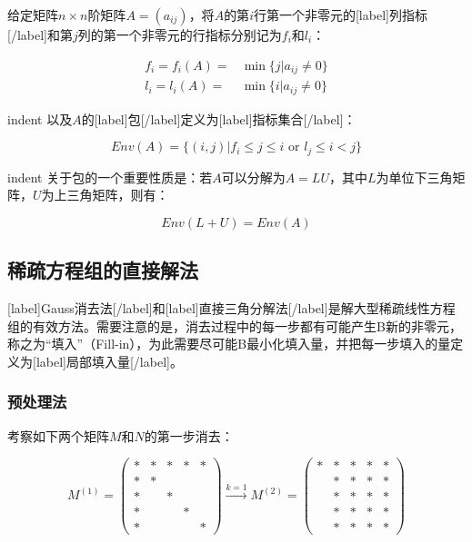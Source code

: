 \documentclass[UTF8,nofonts]{ctexart}
\begin{document}
给定矩阵$n \times n$阶矩阵$A=(a_{ij})$，将$A$的第$i$行第一个非零元的[label]列指标[/label]和第$j$列的第一个非零元的行指标分别记为$f_i$和$l_i$：

\begin{align*}
f_i=f_i(A)=&\min\{j|a_{ij} \neq 0\} \\
l_i=l_i(A)=&\min\{i|a_{ij} \neq 0\}
\end{align*}

indent 以及$A$的[label]包[/label]定义为[label]指标集合[/label]：

\[
Env(A)=\Big\{(i,j)|f_i \leq j \leq i\text{ or }l_j \leq i < j\Big\}
\]

indent 关于包的一个重要性质是：若$A$可以分解为$A=LU$，其中$L$为单位下三角矩阵，$U$为上三角矩阵，则有：

\[Env(L+U)=Env(A)\]

\subsection*{稀疏方程组的直接解法}

[label]Gauss消去法[/label]和[label]直接三角分解法[/label]是解大型稀疏线性方程组的有效方法。需要注意的是，消去过程中的每一步都有可能产生B新的非零元，称之为“填入”（Fill-in），为此需要尽可能B最小化填入量，并把每一步填入的量定义为[label]局部填入量[/label]。

\subsubsection*{预处理法}


考察如下两个矩阵$M$和$N$的第一步消去：

\[
M^{(1)}=\begin{pmatrix}
\ast & \ast & \ast & \ast & \ast \\
\ast & \ast & & & \\
\ast & & \ast & & \\
\ast & & & \ast & \\
\ast & & & & \ast
\end{pmatrix}\xrightarrow{k=1}
M^{(2)}=\begin{pmatrix}
\ast & \ast & \ast & \ast & \ast \\
& \ast & \ast & \ast & \ast \\
& \ast & \ast & \ast & \ast \\
& \ast & \ast & \ast & \ast \\
& \ast & \ast & \ast & \ast
\end{pmatrix}
\]
\end{document}
